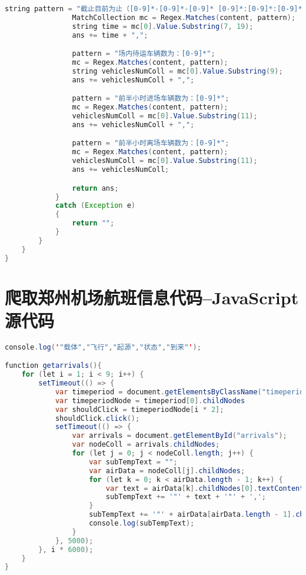 \documentclass{cumcmthesis}
\begin{document}
\begin{appendices}
\begin{lstlisting}[language=java]
                string pattern = "截止目前为止（[0-9]*-[0-9]*-[0-9]* [0-9]*:[0-9]*:[0-9]*）";
                MatchCollection mc = Regex.Matches(content, pattern);
                string time = mc[0].Value.Substring(7, 19);
                ans += time + ",";

                pattern = "场内待运车辆数为：[0-9]*";
                mc = Regex.Matches(content, pattern);
                string vehiclesNumColl = mc[0].Value.Substring(9);
                ans += vehiclesNumColl + ",";

                pattern = "前半小时进场车辆数为：[0-9]*";
                mc = Regex.Matches(content, pattern);
                vehiclesNumColl = mc[0].Value.Substring(11);
                ans += vehiclesNumColl + ",";

                pattern = "前半小时离场车辆数为：[0-9]*";
                mc = Regex.Matches(content, pattern);
                vehiclesNumColl = mc[0].Value.Substring(11);
                ans += vehiclesNumColl;

                return ans;
            }
            catch (Exception e)
            {
                return "";
            }
        }
    }
}

\end{lstlisting}

	\section{爬取郑州机场航班信息代码--JavaScript 源代码}
	\begin{lstlisting}[language=java]
console.log('"载体","飞行","起源","状态","到来"');

function getarrivals(){
    for (let i = 1; i < 9; i++) {
        setTimeout(() => {
            var timeperiod = document.getElementsByClassName("timeperiod");
            var timeperiodNode = timeperiod[0].childNodes
            var shouldClick = timeperiodNode[i * 2];
            shouldClick.click();
            setTimeout(() => {
                var arrivals = document.getElementById("arrivals");
                var nodeColl = arrivals.childNodes;
                for (let j = 0; j < nodeColl.length; j++) {
                    var subTempText = "";
                    var airData = nodeColl[j].childNodes;
                    for (let k = 0; k < airData.length - 1; k++) {
                        var text = airData[k].childNodes[0].textContent;
                        subTempText += '"' + text + '"' + ',';
                    }
                    subTempText += '"' + airData[airData.length - 1].childNodes[0].textContent + '"';
                    console.log(subTempText);
                }
            }, 5000);
        }, i * 6000);
    }    
}


\end{lstlisting}
\end{appendices}
\end{document}
